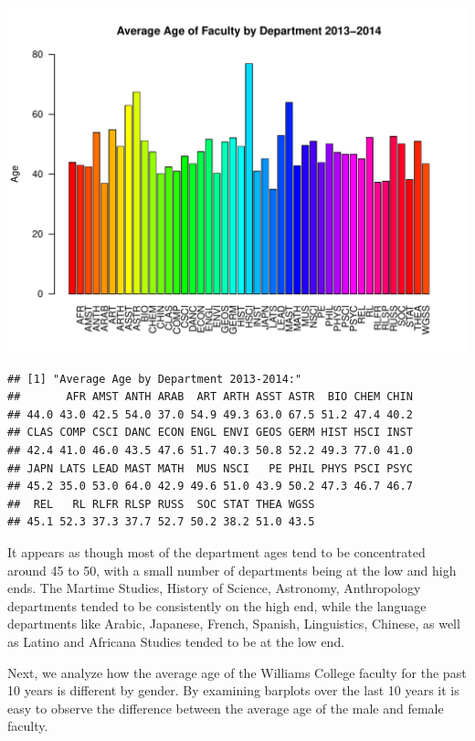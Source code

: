 \documentclass[12pt,a4paper]{article}\usepackage[]{graphicx}\usepackage[]{color}
\makeatletter
\def\maxwidth{ %
  \ifdim\Gin@nat@width>\linewidth
    \linewidth
  \else
    \Gin@nat@width
  \fi
}
\newenvironment{kframe}{%
 \def\at@end@of@kframe{}%
 \ifinner\ifhmode%
  \def\at@end@of@kframe{\end{minipage}}%
  \begin{minipage}{\columnwidth}%
 \fi\fi%
 \def\FrameCommand##1{\hskip\@totalleftmargin \hskip-\fboxsep
 \colorbox{shadecolor}{##1}\hskip-\fboxsep
     \hskip-\linewidth \hskip-\@totalleftmargin \hskip\columnwidth}%
 \MakeFramed {\advance\hsize-\width
   \@totalleftmargin\z@ \linewidth\hsize
   \@setminipage}}%
 {\par\unskip\endMakeFramed%
 \at@end@of@kframe}
\newenvironment{knitrout}{}{} %
\theoremstyle{definition}
\makeatother
\begin{document}
\begin{knitrout}
\includegraphics[width=\maxwidth]{figure/unnamed-chunk-10-10} 
\begin{kframe}\begin{verbatim}
## [1] "Average Age by Department 2013-2014:"
##       AFR AMST ANTH ARAB  ART ARTH ASST ASTR  BIO CHEM CHIN 
## 44.0 43.0 42.5 54.0 37.0 54.9 49.3 63.0 67.5 51.2 47.4 40.2 
## CLAS COMP CSCI DANC ECON ENGL ENVI GEOS GERM HIST HSCI INST 
## 42.4 41.0 46.0 43.5 47.6 51.7 40.3 50.8 52.2 49.3 77.0 41.0 
## JAPN LATS LEAD MAST MATH  MUS NSCI   PE PHIL PHYS PSCI PSYC 
## 45.2 35.0 53.0 64.0 42.9 49.6 51.0 43.9 50.2 47.3 46.7 46.7 
##  REL   RL RLFR RLSP RUSS  SOC STAT THEA WGSS 
## 45.1 52.3 37.3 37.7 52.7 50.2 38.2 51.0 43.5
\end{verbatim}
\end{kframe}
\end{knitrout}

\bigskip
It appears as though most of the department ages tend to be concentrated around 45 to 50, with a small number of departments being at the low and high ends. The Martime Studies, History of Science, Astronomy, Anthropology departments tended to be consistently on the high end, while the language departments like Arabic, Japanese, French, Spanish, Linguistics, Chinese, as well as Latino and Africana Studies tended to be at the low end.

\bigskip
Next, we analyze how the average age of the Williams College faculty for the past 10 years is different by gender. By examining barplots over the last 10 years it is easy to observe the difference between the average age of the male and female faculty.
\end{document}
